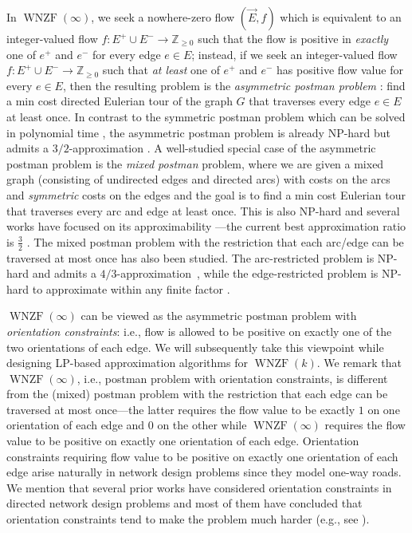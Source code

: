 \documentclass[11pt]{article}
\newcommand{\Z}{\mathbb{Z}}
\begin{document}
In $\operatorname{WNZF}(\infty)$, we seek a nowhere-zero flow $(\vec{E}, f)$ which is equivalent to an integer-valued flow $f: E^+\cup E^-\rightarrow \Z_{\ge 0}$ such that the flow is positive in {\it exactly} one of $e^+$ and $e^-$ for every edge $e\in E$; instead, if we seek an integer-valued flow $f: E^+\cup E^-\rightarrow \Z_{\ge 0}$ such that {\it at least} one of $e^+$ and $e^-$ has positive flow value for every $e\in E$, then the resulting problem is the \emph{asymmetric postman problem} \cite{minieka1979chinese}: find a min cost directed Eulerian tour of the graph $G$ that traverses every edge $e\in E$ at least once. 
In contrast to the symmetric postman problem which can be solved in polynomial time \cite{edmonds1973matching}, 
the asymmetric postman problem is already NP-hard but admits a $3/2$-approximation \cite{win1989windy, raghavachari1999approximation}. A well-studied special case of the asymmetric postman problem is the \emph{mixed postman} problem, where we are given a mixed graph (consisting of undirected edges and directed arcs) with costs on the arcs and \textit{symmetric} costs on the edges and the goal is to find a min cost Eulerian tour that traverses every arc and edge at least once. This is also NP-hard \cite{papadimitriou1976complexity} and several works have focused on its approximability \cite{edmonds1973matching,christofides1984optimal,frederickson1979approximation,raghavachari19993}---the current best approximation ratio is $\frac{3}{2}$ \cite{raghavachari19993}. 
The mixed postman problem with the restriction that each arc/edge can be traversed at most once has also been studied. The arc-restricted problem is NP-hard and admits a $4/3$-approximation~\cite{zaragoza2003postman}, while the edge-restricted problem is NP-hard to approximate within any finite factor \cite{zaragoza2003postman,veerasamy1999approximation,martinez2006complexity}.


$\operatorname{WNZF}(\infty)$ can be viewed as the asymmetric postman problem with \emph{orientation constraints}: i.e., flow is allowed to be positive on exactly one of the two orientations of each edge.
We will subsequently take this viewpoint while designing LP-based approximation algorithms for $\operatorname{WNZF}(k)$. We remark that $\operatorname{WNZF}(\infty)$, i.e., postman problem with orientation constraints, is different from the (mixed) postman problem with the restriction that each edge can be traversed at most once---the latter requires the flow value to be exactly $1$ on one orientation of each edge and $0$ on the other while $\operatorname{WNZF}(\infty)$ requires the flow value to be positive on exactly one orientation of each edge. Orientation constraints requiring flow value to be positive on exactly one orientation of each edge arise naturally in network design problems since they model one-way roads. 
We mention that several prior works have considered orientation constraints in directed network design problems and most of them have concluded that orientation constraints tend to make the problem much harder (e.g., see \cite{frank2003combined,khanna2005directed,singh2018approximating,cygan2013steiner}). 
\end{document}
